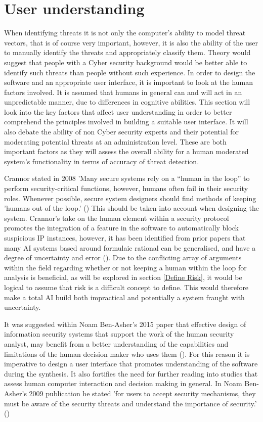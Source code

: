 
\section{User understanding} \label{UI Theory}
When identifying threats it is not only the computer's ability to model threat vectors, that is of course very important, however, it is also the ability of the user to manually identify the threats and appropriately classify them. Theory would suggest that people with a Cyber security background would be better able to identify such threats than people without such experience. In order to design the software and an appropriate user interface, it is important to look at the human factors involved. It is assumed that humans in general can and will act in an unpredictable manner, due to differences in cognitive abilities. This section will look into the key factors that affect user understanding in order to better comprehend the principles involved in building a suitable user interface. It will also debate the ability of non Cyber security experts and their potential for moderating potential threats at an administration level. These are both important factors as they will assess the overall ability for a human moderated system's functionality in terms of accuracy of threat detection.

Crannor stated in 2008 'Many secure systems rely on a “human in the loop” to perform security-critical functions, however, humans often fail in their security roles. Whenever possible, secure system designers should find methods of keeping 'humans out of the loop.' (\cite{cranor2008framework}) This should be taken into account when designing the system. Crannor's take on the human element within a security protocol promotes the integration of a feature in the software to automatically block suspicious IP instances, however, it has been identified from prior papers that many AI systems based around formulaic rational can be generalised, and have a degree of uncertainty and error (\cite{kim2008slow}). Due to the conflicting array of arguments within the field regarding whether or not keeping a human within the loop for analysis is beneficial, as will be explored in section \ref{Define Risk}, it would be logical to assume that risk is a difficult concept to define. This would therefore make a total AI build both impractical and potentially a system fraught with uncertainty.

It was suggested within Noam Ben-Asher's 2015 paper that effective design of information security systems that support the work of the human security analyst, may benefit from a better understanding of the capabilities and limitations of the human decision maker who uses them (\cite{ben2015effects}). For this reason it is imperative to design a user interface that promotes understanding of the software during the synthesis. It also fortifies the need for further reading into studies that assess human computer interaction and decision making in general. In Noam Ben-Asher's 2009 publication he stated 'for users to accept security mechanisms, they must be aware of the security threats and understand the importance of security.' (\cite{ben2009experimental})

